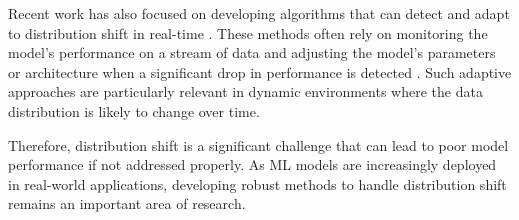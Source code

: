Recent work has also focused on developing algorithms that can detect and adapt to distribution shift in real-time \cite{lu2018learning}. These methods often rely on monitoring the model's performance on a stream of data and adjusting the model's parameters or architecture when a significant drop in performance is detected \cite{baena2006early}. Such adaptive approaches are particularly relevant in dynamic environments where the data distribution is likely to change over time.

Therefore, distribution shift is a significant challenge  that can lead to poor model performance if not addressed properly. %
As ML models are increasingly deployed in real-world applications, developing robust methods to handle distribution shift remains an important area of research.



